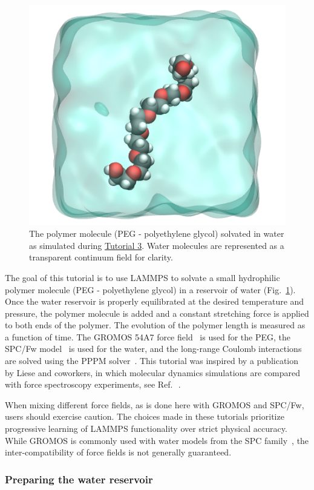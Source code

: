 \documentclass[9pt,tutorial]{livecoms}
\begin{document}
\begin{figure}
\centering
\includegraphics[width=0.55\linewidth]{PEG}
\caption{The polymer molecule (PEG - polyethylene glycol) solvated in water as
simulated during \hyperref[all-atom-label]{Tutorial 3}.  Water molecules are
represented as a transparent continuum field for clarity.}
\label{fig:PEG}
\end{figure}

The goal of this tutorial is to use LAMMPS to solvate a small
hydrophilic polymer molecule (PEG - polyethylene glycol) in a reservoir of water
(Fig.~\ref{fig:PEG}).  Once the water reservoir is properly equilibrated
at the desired temperature and pressure, the polymer molecule is added
and a constant stretching force is applied to both ends of the polymer.
The evolution of the polymer length is measured as a function of time.
The {GROMOS} 54A7 force field~\cite{schmid2011definition} is used for the
PEG, the SPC/Fw model~\cite{wu2006flexible} is used for the water, and
the long-range Coulomb interactions are solved using the PPPM
solver~\cite{luty1996calculating}.  This tutorial was inspired by a
publication by Liese and coworkers, in which molecular dynamics
simulations are compared with force spectroscopy experiments, see
Ref.\,~.

\begin{note}
  When mixing different force fields, as is done here with GROMOS
  and SPC/Fw, users should exercise caution.  The choices made in these tutorials
  prioritize progressive learning of LAMMPS functionality
  over strict physical accuracy.  While GROMOS is commonly used with water
  models from the SPC family~\cite{oostenbrink2004biomolecular},
  the inter-compatibility of force fields is not generally guaranteed.
\end{note}

\subsubsection{Preparing the water reservoir}
\end{document}
